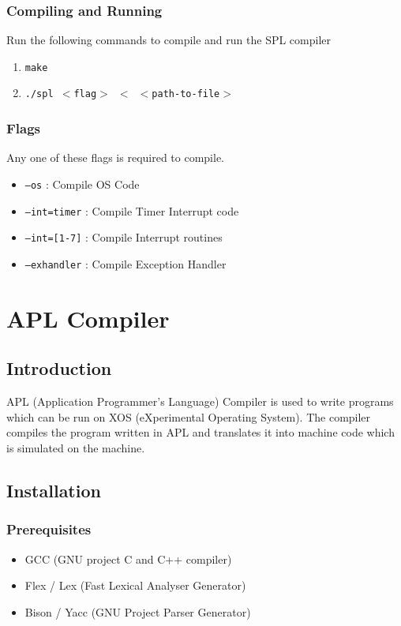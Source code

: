 \documentclass[11pt]{report}
\begin{document}
\subsection{Compiling and Running}
Run the following commands to compile and run the SPL compiler
\begin{enumerate}
		\item \texttt{make}
		\item \texttt{./spl $<$flag$>$ $<$ $<$path-to-file$>$ }
\end{enumerate}

\subsection{Flags}
Any one of these flags is required to compile.
\begin{itemize}
	\item \texttt{--os} : Compile OS Code
	\item \texttt{--int=timer} : Compile Timer Interrupt code
	\item \texttt{--int=[1-7]} : Compile Interrupt routines
	\item \texttt{--exhandler} : Compile Exception Handler
\end{itemize}


\chapter{APL Compiler}

\section{Introduction}
APL (Application Programmer's Language) Compiler is used to write programs which can be run on XOS (eXperimental Operating System). The compiler compiles the program written in APL and translates it into machine code which is simulated on the machine.

\section{Installation}

\subsection{Prerequisites}
\begin{itemize}
	\item GCC  (GNU project C and C++ compiler)
	\item Flex / Lex  (Fast Lexical Analyser Generator)
	\item Bison / Yacc  (GNU Project Parser Generator)
\end{itemize} 
\end{document}
